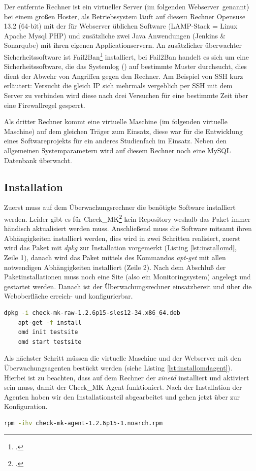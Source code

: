 \documentclass[12pt,a4paper,parskip,listof=totoc,bibliography=totoc]{scrreprt}
\begin{document}
	Der entfernte Rechner ist ein virtueller Server (im folgenden \glqq Webserver\grqq\ genannt) bei einem großen Hoster, als Betriebssystem läuft auf diesem Rechner Opensuse 13.2 (64-bit) mit der für Webserver üblichen Software (LAMP-Stack = Linux Apache Mysql PHP) und zusätzliche zwei Java Anwendungen (Jenkins \& Sonarqube) mit ihren eigenen Applicationservern. An zusätzlicher überwachter Sicherheitssoftware ist Fail2Ban\footcite{fail2ban} installiert, bei Fail2Ban handelt es sich um eine Sicherheitssoftware, die das Systemlog () auf bestimmte Muster durchsucht, dies dient der Abwehr von Angriffen gegen den Rechner. Am Beispiel von SSH kurz erläutert: Versucht die gleich IP sich mehrmals vergeblich per SSH mit dem Server zu verbinden wird diese nach drei Versuchen für eine bestimmte Zeit über eine Firewallregel gesperrt.
	
	Als dritter Rechner kommt eine virtuelle Maschine (im folgenden \glqq virtuelle Maschine\grqq) auf dem gleichen Träger zum Einsatz, diese war für die Entwicklung eines Softwareprojekts für ein anderes Studienfach im Einsatz. Neben den allgemeinen Systemparametern wird auf diesem Rechner noch eine MySQL Datenbank überwacht.
	\subsection{Installation}
	Zuerst muss auf dem Überwachungsrechner die benötigte Software installiert werden. Leider gibt es für Check\_MK\footcite{checkmk} kein Repository weshalb das Paket immer händisch aktualisiert werden muss.
    Anschließend muss die Software mitsamt ihren Abhängigkeiten installiert werden, dies wird in zwei Schritten realisiert, zuerst wird das Paket mit \textit{dpkg} zur Installation vorgemerkt (Listing \ref{lst:installomd}, Zeile 1), danach wird das Paket mittels des Kommandos \textit{apt-get} mit allen notwendigen Abhängigkeiten installiert (Zeile 2). Nach dem Abschluß der Paketinstallationen muss noch eine Site (also ein Monitoringsystem) angelegt und gestartet werden. Danach ist der Überwachungsrechner einsatzbereit und über die Weboberfläche erreich- und konfigurierbar. \medskip
	\begin{lstlisting}[language=bash, caption=Installation von Check\_MK, label=lst:installomd]	
	dpkg -i check-mk-raw-1.2.6p15-sles12-34.x86_64.deb
	apt-get -f install
	omd init testsite 
	omd start testsite\end{lstlisting}
	Als nächster Schritt müssen die virtuelle Maschine und der Webserver mit den Überwachungsagenten bestückt werden (siehe Listing \ref{lst:installomdagent}). Hierbei ist zu beachten, dass auf dem Rechner der \textit{xinetd} installiert und aktiviert sein muss, damit der Check\_MK Agent funktioniert. Nach der Installation der Agenten haben wir den Installationsteil abgearbeitet und gehen jetzt über zur Konfiguration.
	\begin{lstlisting}[language=bash, caption=Installation des Check\_MK Agenten, label=lst:installomdagent]
	rpm -ihv check-mk-agent-1.2.6p15-1.noarch.rpm\end{lstlisting}
\end{document}
